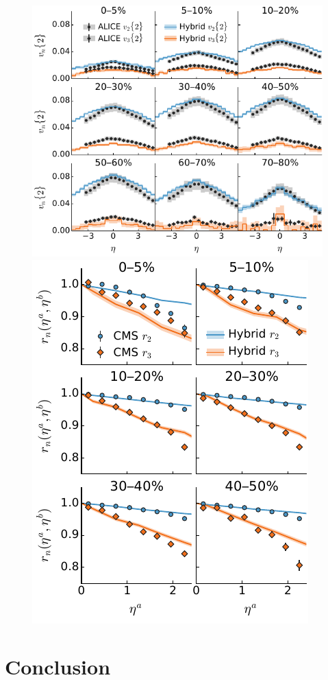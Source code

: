 \documentclass[3p,times,twocolumn]{elsarticle}
\begin{document}
\begin{figure}
\includegraphics{vn_eta.pdf}
\hfill
\includegraphics{evt_pln_decorr.pdf}
\end{figure}
\label{Result}

\section{Conclusion}
\label{Conclusion}
\end{document}
